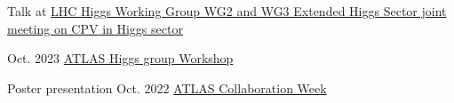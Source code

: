 
\begin{cventries}

{}
{}
{}
{
    \begin{cvitems}
    \item Talk at \href{https://indico.cern.ch/event/1230456/\#5-simulation-based-inference-i}{LHC Higgs Working Group WG2 and WG3 Extended Higgs Sector joint meeting on CPV in Higgs sector}
    \end{cvitems}
}

\end{cventries}


\begin{cventries}

{}
{Oct. 2023}
{\href{https://indico.cern.ch/event/1280531/contributions/5559532/}{ATLAS Higgs group Workshop}}{}

{Poster presentation}
{Oct. 2022}
{\href{https://indico.cern.ch/event/1187086/\#37-the-atlas-jet-trigger-in-ru}{ATLAS Collaboration Week}}
{}

\end{cventries}


